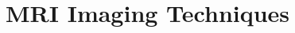 \chapter{MRI Imaging Techniques}\label{chap:2}

\ifpdf
    \graphicspath{{2_modality/figures/}}
\else
    \graphicspath{{2_modality/figures/}}
\fi


%

